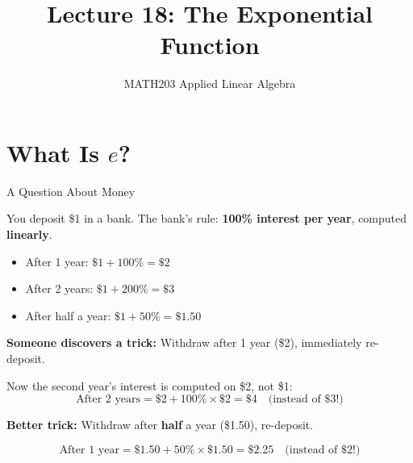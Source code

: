 \documentclass[10pt]{beamer}
\title{Lecture 18: The Exponential Function}
\subtitle{MATH203 Applied Linear Algebra}
\date{}
\theoremstyle{definition}
\newcommand{\x}[1]{\alert{\textbf{#1}}}
\begin{document}
\maketitle


\section{What Is $e$?}


\begin{frame}[shrink=5]{A Question About Money}

You deposit \$1 in a bank. The bank's rule: \x{100\% interest per year}, computed \x{linearly}.

\vfill

\begin{itemize}
\item After 1 year: $\$1 + 100\% = \$2$
\item After 2 years: $\$1 + 200\% = \$3$
\item After half a year: $\$1 + 50\% = \$1.50$
\end{itemize}

\vfill\pause

\textbf{Someone discovers a trick:} Withdraw after 1 year (\$2), immediately re-deposit.

Now the second year's interest is computed on \$2, not \$1:
$$\text{After 2 years} = \$2 + 100\% \times \$2 = \$4 \quad \text{(instead of \$3!)}$$

\vfill\pause

\textbf{Better trick:} Withdraw after \x{half} a year (\$1.50), re-deposit.

$$\text{After 1 year} = \$1.50 + 50\% \times \$1.50 = \$2.25 \quad \text{(instead of \$2!)}$$

\end{frame}
\end{document}
